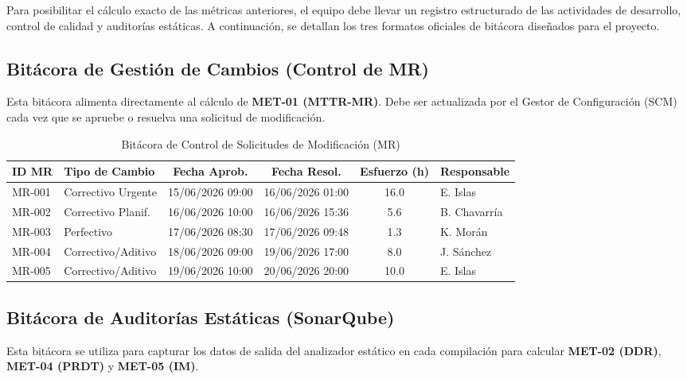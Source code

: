 \documentclass[12pt]{article}
\begin{document}
Para posibilitar el cálculo exacto de las métricas anteriores, el equipo debe llevar un registro estructurado de las actividades de desarrollo, control de calidad y auditorías estáticas. A continuación, se detallan los tres formatos oficiales de bitácora diseñados para el proyecto.

\subsection{Bitácora de Gestión de Cambios (Control de MR)}
Esta bitácora alimenta directamente al cálculo de \textbf{MET-01 (MTTR-MR)}. Debe ser actualizada por el Gestor de Configuración (SCM) cada vez que se apruebe o resuelva una solicitud de modificación.

\begin{table}[H]
    \centering\footnotesize
    \caption{Bitácora de Control de Solicitudes de Modificación (MR)}
    \label{tab:bitacora_mr}
    \begin{tabularx}{\textwidth}{llcccX}
        \toprule
        \textbf{ID MR} & \textbf{Tipo de Cambio} & \textbf{Fecha Aprob.} & \textbf{Fecha Resol.} & \textbf{Esfuerzo (h)} & \textbf{Responsable} \\
        \midrule
        MR-001 & Correctivo Urgente & 15/06/2026 09:00 & 16/06/2026 01:00 & 16.0 & E. Islas \\
        MR-002 & Correctivo Planif. & 16/06/2026 10:00 & 16/06/2026 15:36 & 5.6  & B. Chavarría \\
        MR-003 & Perfectivo          & 17/06/2026 08:30 & 17/06/2026 09:48 & 1.3  & K. Morán \\
        MR-004 & Correctivo/Aditivo  & 18/06/2026 09:00 & 19/06/2026 17:00 & 8.0  & J. Sánchez \\
        MR-005 & Correctivo/Aditivo  & 19/06/2026 10:00 & 20/06/2026 20:00 & 10.0 & E. Islas \\
        \bottomrule
    \end{tabularx}
\end{table}

\subsection{Bitácora de Auditorías Estáticas (SonarQube)}
Esta bitácora se utiliza para capturar los datos de salida del analizador estático en cada compilación para calcular \textbf{MET-02 (DDR)}, \textbf{MET-04 (PRDT)} y \textbf{MET-05 (IM)}.
\end{document}
